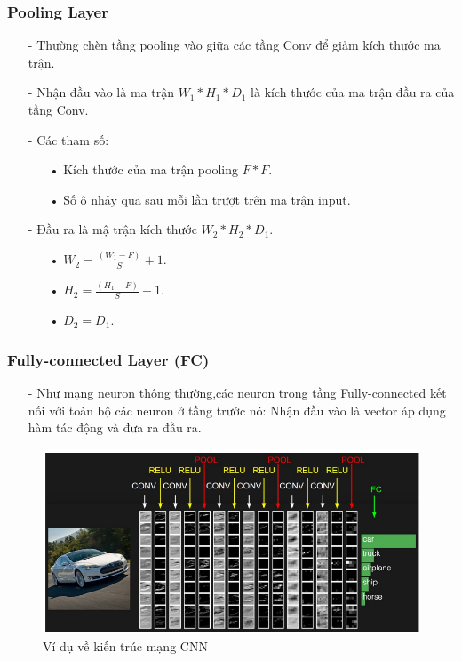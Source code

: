 \documentclass[a4paper,12pt]{report}
\begin{document}
\subsubsection{Pooling Layer}
\begin{itemize}
\item[-] Thường chèn tầng pooling vào giữa các tầng Conv để giảm kích thước ma trận.
\item[-] Nhận đầu vào là ma trận $W_1*H_1*D_1$ là kích thước của ma trận đầu ra của tầng Conv.
\item[-] Các tham số:
\begin{itemize}
\item[•] Kích thước của ma trận pooling $F*F$.
\item[•] Số ô nhảy qua sau mỗi lần trượt trên ma trận input.
\end{itemize}
\item[-] Đầu ra là mậ trận kích thước $W_2*H_2*D_1$.
\begin{itemize}
\item[•] $W_2 = \frac{(W_1 - F)}{S} + 1$.
\item[•] $H_2 = \frac{(H_1 - F)}{S} + 1$.
\item[•] $D_2 = D_1$.
\end{itemize}
\end{itemize}
\subsubsection{Fully-connected Layer (FC)}
\begin{itemize}
\item[-] Như mạng neuron thông thường,các neuron trong tầng Fully-connected kết nối với toàn bộ các neuron ở tầng trước nó: Nhận đầu vào là vector áp dụng hàm tác động và đưa ra đầu ra.
\end{itemize}
\begin{figure}[h]
\begin{center}
\includegraphics[width =0.8 \textwidth]{ConvNetArchitecture.png}
\end{center}
\caption{Ví dụ về kiến trúc mạng CNN}
\end{figure}
\end{document}
